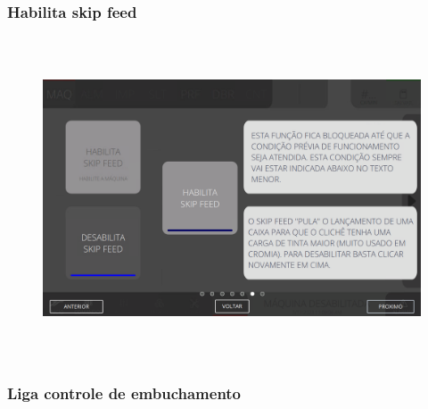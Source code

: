 \vspace*{\fill}

\newpage
\thispagestyle{fancy}

\vspace*{40 pt}

\subsubsection{\small{Habilita skip feed}}\label{telaComandosMaquinaHabilitaSkipFeed}

\vspace*{\fill}

\begin{figure}[h]
  \centering
  \includegraphics[width=576px,height=360px]{src/imagesFlexo/02-machine/e-6.png}
\end{figure}

\vspace*{\fill}

\newpage
\thispagestyle{fancy}

\vspace*{40 pt}

\subsubsection{\small{Liga controle de embuchamento}}\label{telaComandosMaquinaLigaControleDeEmbuchamento}

\vspace*{\fill}

